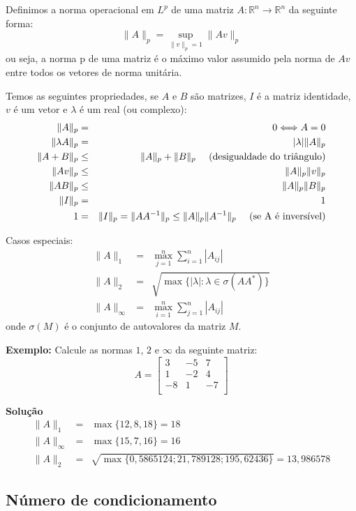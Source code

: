 Definimos a norma operacional em $L^p$ de uma matriz $A:\mathbb{R}^{n}\to \mathbb{R}^{n}$ da seguinte forma:
$$\|A\|_p = \sup_{\|v\|_p=1} \|Av\|_p$$
ou seja, a norma p de uma matriz é o máximo valor assumido pela norma de $Av$ entre todos os vetores de norma unitária.

Temos as seguintes propriedades, se $A$ e $B$ são matrizes, $I$ é a matriz identidade, $v$ é um vetor e $\lambda$ é um real (ou complexo):
\begin{eqnarray*}
\|A\|_p&=&0 \Longleftrightarrow A=0\\
\|\lambda A\|_p&=&|\lambda| \|A\|_p\\
\|A+B\|_p &\leq & \|A\|_p + \|B\|_p~~~~ (\hbox{desigualdade do triângulo})\\
\|Av\|_p &\leq& \|A\|_p\|v\|_p\\
\|AB\|_p &\leq& \|A\|_p\|B\|_p\\
\|I\|_p&=&1\\
1&=&\|I\|_p=\|AA^{-1}\|_p\leq \|A\|_p\|A^{-1}\|_p~~~~ \hbox{(se A é inversível)}
\end{eqnarray*}

Casos especiais:
\begin{eqnarray*}
\|A\|_1&=& \max_{j=1}^n\sum_{i=1}^n |A_{ij}|\\
\|A\|_2&=& \sqrt{\max\{|\lambda|: \lambda \in \sigma(AA^*)\}}\\
\|A\|_\infty&=& \max_{i=1}^n\sum_{j=1}^n |A_{ij}|
\end{eqnarray*}
onde $\sigma(M)$ é o conjunto de autovalores da matriz $M$.

{\bf Exemplo:}
Calcule as normas $1$, $2$ e $\infty$ da seguinte matriz:
$$A=\left[
\begin{array}{ccc}
3 & -5 & 7\\
1 & -2 & 4\\
-8 & 1 & -7\\
\end{array}
\right]$$

{\bf Solução}
\begin{eqnarray*}
\|A\|_1&=&\max\{12,8,18\}=18\\
\|A\|_\infty&=&\max\{15,7,16\}=16\\
\|A\|_2&=&\sqrt{\max\{0,5865124; 21,789128 ;195,62436\}}= 13,986578
\end{eqnarray*}

\subsection{Número de condicionamento}

